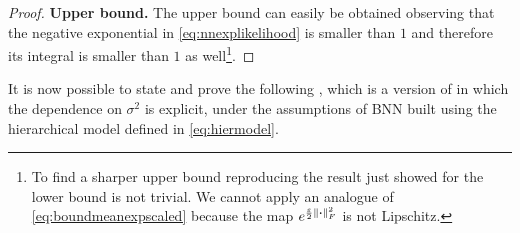 \begin{proof}
	\textbf{Upper bound.} The upper bound can easily be obtained observing that the negative exponential in \cref{eq:nnexplikelihood} is smaller than $1$ and therefore its integral is smaller than $1$ as well\footnote{To find a sharper upper bound reproducing the result just showed for the lower bound is not trivial. We cannot apply an analogue of \cref{eq:boundmeanexpscaled} because the map $e^{\frac{\varepsilon}{2} \left\lVert\bm{\cdot}\right\rVert_F^2}$ is not Lipschitz.}.
\end{proof}

It is now possible to state and prove the following , which is a version of  in which the dependence on $\sigma^2$ is explicit, under the assumptions of BNN built using the hierarchical model defined in \cref{eq:hiermodel}.

